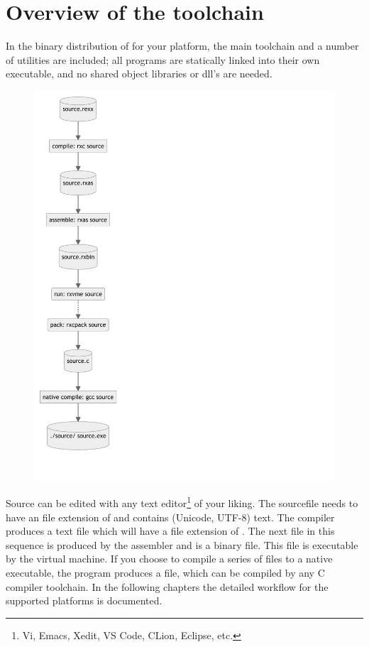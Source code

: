 \chapter{Overview of the toolchain}
In the binary distribution of \crexx{} for your platform, the main
toolchain and a number of utilities are included; all programs are statically linked into
their own executable, and no shared object libraries or dll's are needed.\newline
\begin{figure}
\includegraphics[scale=0.6]{charts/buildflow.pdf}
\end{figure}
\fussy
Source can be edited with any text editor\footnote{Vi, Emacs, Xedit,
  VS Code, CLion, Eclipse, etc.} of your liking. The sourcefile needs to have an
file extension of  and contains (Unicode, UTF-8) text. The  \crexx{} compiler
produces a text file which will have a file extension of
. The next file in this sequence is produced by the
 assembler and is a binary  file. This file is
executable by the \crexx{}  virtual machine.\newline\newline
\fussy
If you choose to compile a series of  files to a native
executable, the  program produces a  file,
which can be compiled by any C compiler toolchain.\newline\newline
\fussy
In the following chapters the detailed workflow for the supported platforms is documented.\newline

